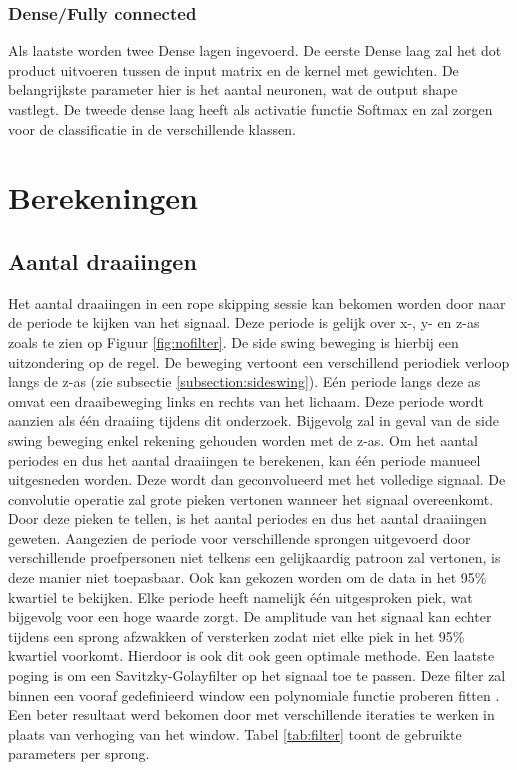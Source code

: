 \subsubsection{Dense/Fully connected}
Als laatste worden twee Dense lagen ingevoerd. De eerste Dense laag zal het dot product uitvoeren tussen de input matrix en de kernel met gewichten. De belangrijkste parameter hier is het aantal neuronen, wat de output shape vastlegt. De tweede dense laag heeft als activatie functie Softmax en zal zorgen voor de classificatie in de verschillende klassen.

\section{Berekeningen}
\subsection{Aantal draaiingen}
Het aantal draaiingen in een rope skipping sessie kan bekomen worden door naar de periode te kijken van het signaal. Deze periode is gelijk over x-, y- en z-as zoals te zien op Figuur \ref{fig:nofilter}. De side swing beweging is hierbij een uitzondering op de regel. De beweging vertoont een verschillend periodiek verloop langs de z-as (zie subsectie \ref{subsection:sideswing}). Eén periode langs deze as omvat een draaibeweging links en rechts van het lichaam. Deze periode wordt aanzien als één draaiing tijdens dit onderzoek. Bijgevolg zal in geval van de side swing beweging enkel rekening gehouden worden met de z-as.
Om het aantal periodes en dus het aantal draaiingen te berekenen, kan één periode manueel uitgesneden worden. Deze wordt dan geconvolueerd met het volledige signaal. De convolutie operatie zal grote pieken vertonen wanneer het signaal overeenkomt. Door deze pieken te tellen, is het aantal periodes en dus het aantal draaiingen geweten. Aangezien de periode voor verschillende sprongen uitgevoerd door verschillende proefpersonen niet telkens een gelijkaardig patroon zal vertonen, is deze manier niet toepasbaar.
Ook kan gekozen worden om de data in het 95\% kwartiel te bekijken. Elke periode heeft namelijk één uitgesproken piek, wat bijgevolg voor een hoge waarde zorgt. De amplitude van het signaal kan echter tijdens een sprong afzwakken of versterken zodat niet elke piek in het 95\% kwartiel voorkomt. Hierdoor is ook dit ook geen optimale methode.
Een laatste poging is om een Savitzky-Golayfilter op het signaal toe te passen. Deze filter zal binnen een vooraf gedefinieerd window een polynomiale functie proberen fitten \cite{ref70}. Een beter resultaat werd bekomen door met verschillende iteraties te werken in plaats van verhoging van het window. Tabel \ref{tab:filter} toont de gebruikte parameters per sprong.

